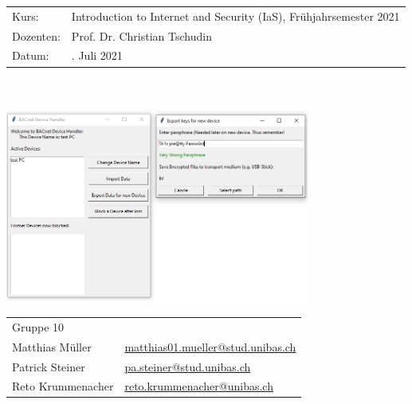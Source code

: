 \documentclass[a4paper,titlepage]{article}
\newcommand{\titleName}{Multi Device Feed}
\begin{document}

\begin{titlepage}
	\begin{tabular}{@{}ll}
		Kurs: &\indent Introduction to Internet and Security (IaS), Frühjahrsemester 2021  \\
		Dozenten: &\indent Prof. Dr. Christian Tschudin  \\
		Datum: &\indent 18. Juli 2021
	\end{tabular}
	\vspace*{1cm}   
	\begin{center}
		\large
		{\color{NavyBlue}{Projekt Report}} \\	
		\vspace*{1cm}   
	        \Huge
	        {\color{NavyBlue}{BACnet: \\ \titleName}}\\
	        \Large
        	\vspace*{1cm}   
	        \includegraphics[width=0.75\textwidth]{figures/UIexport}  
		\vfill
	        \normalsize
		\begin{tabular}{@{}ll}
			Gruppe 10 \\
			Matthias Müller &\indent \href{mailto:matthias01.mueller@stud.unibas.ch}{matthias01.mueller@stud.unibas.ch}  \\
			Patrick Steiner &\indent \href{mailto:pa.steiner@stud.unibas.ch}{pa.steiner@stud.unibas.ch}  \\
			Reto Krummenacher &\indent \href{mailto:reto.krummenacher@unibas.ch}{reto.krummenacher@unibas.ch}
		\end{tabular}
	\end{center}  
\end{titlepage}

\clearpage
\setcounter{page}{1}
\end{document}
